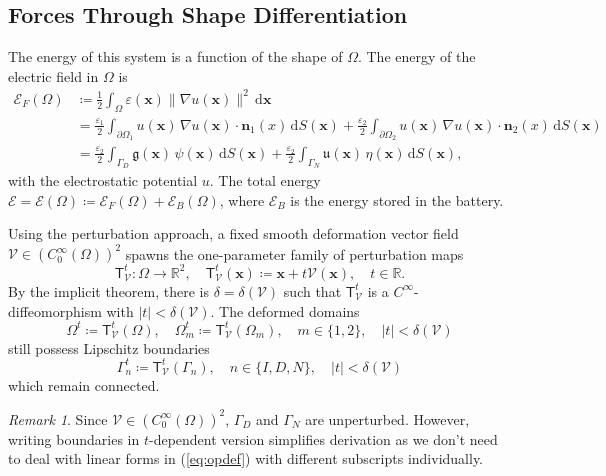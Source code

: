 \documentclass{article}
\theoremstyle{remark}
\newtheorem*{remark}{Remark}
\newcommand{\T}{\mathsf{T}}
\newcommand{\x}{\boldsymbol{x}}
\newcommand{\dd}{\mathrm{d}}
\newcommand{\n}{\boldsymbol{n}}
\newcommand{\argu}{\mathfrak{u}}
\newcommand{\argg}{\mathfrak{g}}
\newcommand{\Eps}{\mathcal{E}}
\newcommand{\Nu}{\mathcal{V}}
\newcommand{\Tt}{\T_\Nu^t}
\begin{document}
\subsection{Forces Through Shape Differentiation}
The energy of this system is a function of the shape of $\Omega$. The energy of the electric field in $\Omega$ is
\begin{equation}
\begin{aligned}
    \Eps_F(\Omega)&\coloneqq\frac{1}{2}\int_{\Omega}\varepsilon(\x)\|\nabla u(\x)\|^2\,\dd\x\\
    &=\frac{\varepsilon_1}{2}\int_{\partial\Omega_1}u(\x)\,\nabla u(\x)\cdot\n_1(x)\,\dd S(\x)+\frac{\varepsilon_2}{2}\int_{\partial\Omega_2}u(\x)\,\nabla u(\x)\cdot\n_2(x)\,\dd S(\x)\\
    &=\frac{\varepsilon_2}{2}\int_{\Gamma_D}\argg(\x)\,\psi(\x)\,\dd S(\x)+\frac{\varepsilon_2}{2}\int_{\Gamma_N}\argu(\x)\,\eta(\x)\,\dd S(\x),
\end{aligned}
\end{equation}
with the electrostatic potential $u$. The total energy $\Eps=\Eps(\Omega)\coloneqq\Eps_F(\Omega)+\Eps_B(\Omega)$, where $\Eps_B$ is the energy stored in the battery.

Using the perturbation approach, a fixed smooth deformation vector field $\Nu\in\left(C_0^\infty(\Omega)\right)^2$ spawns the one-parameter family of perturbation maps
\begin{equation}
    \Tt:\Omega\to\mathbb{R}^2,\quad\Tt(\x)\coloneqq\x+t\Nu(\x),\quad t\in\mathbb{R}.
\end{equation}
By the implicit theorem, there is $\delta=\delta(\Nu)$ such that $\Tt$ is a $C^\infty$-diffeomorphism with $|t|<\delta(\Nu)$. The deformed domains
\begin{equation}
\label{eq:dom-t}
    \Omega^t\coloneqq\Tt(\Omega),\quad\Omega_m^t\coloneqq\Tt(\Omega_m),\quad m\in\{1,2\},\quad |t|<\delta(\Nu)
\end{equation}
still possess Lipschitz boundaries
\begin{equation}
\label{eq:bdry-t}
    \Gamma_n^t\coloneqq\Tt(\Gamma_n),\quad n\in\{I,D,N\},\quad |t|<\delta(\Nu)
\end{equation}
which remain connected.

\begin{remark}
    Since $\Nu\in\left(C_0^\infty(\Omega)\right)^2$, $\Gamma_D$ and $\Gamma_N$ are unperturbed. However, writing boundaries in $t$-dependent version simplifies derivation as we don't need to deal with linear forms in (\ref{eq:opdef}) with different subscripts individually.
\end{remark}
\end{document}
